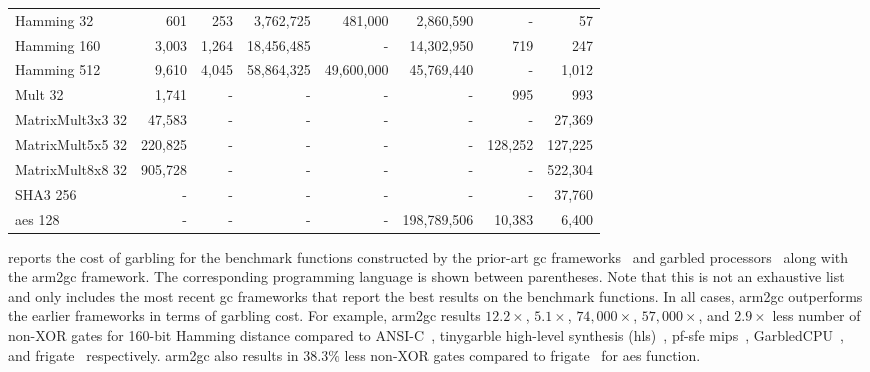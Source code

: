 \begin{table*}[t]
{\begin{tabular}{l||r|r|r|r|r|r||r}
Hamming 32 & 601 & 253 & 3,762,725 & 481,000 & 2,860,590 & - & 57 \\
Hamming 160 & 3,003 & 1,264 & 18,456,485 & - & 14,302,950 & 719 & 247 \\
Hamming 512 & 9,610 & 4,045 & 58,864,325 & 49,600,000 & 45,769,440 & - & 1,012 \\
Mult 32 & 1,741 & - & - & - & - & 995 & 993 \\
MatrixMult3x3 32 & 47,583 & - & - & - & - & - & 27,369 \\
MatrixMult5x5 32 & 220,825 & - & - & - & - & 128,252 & 127,225 \\
MatrixMult8x8 32 & 905,728 & - & - & - & - & - & 522,304 \\
SHA3 256 & - & - & - & - & - & - & 37,760 \\
\acrshort{aes} 128 & - & - & - & - & 198,789,506 & 10,383 & 6,400
\end{tabular}
}
\end{table*}

 reports the cost of garbling for the benchmark functions constructed by the prior-art \acrshort{gc} frameworks~\cite{holzer2012secure, songhori2015tinygarble, mood2016frigate} and garbled processors~\cite{wang2016secure, songhori2016garbledcpu} along with the \gls{arm2gc} framework.
The corresponding programming language is shown between parentheses.
Note that this is not an exhaustive list and only includes the most recent \acrshort{gc} frameworks that report the best results on the benchmark functions.
In all cases, \gls{arm2gc} outperforms the earlier frameworks in terms of garbling cost.
For example, \gls{arm2gc} results $12.2\times$,  $5.1\times$, $74,000\times$, $57,000\times$, and $2.9\times$ less number of non-XOR gates for 160-bit Hamming distance compared to ANSI-C~\cite{holzer2012secure}, \gls{tinygarble} high-level synthesis (\acrshort{hls})~\cite{songhori2015tinygarble}, \acrshort{pf-sfe} \gls{mips}~\cite{songhori2015tinygarble}, GarbledCPU~\cite{songhori2016garbledcpu}, and \gls{frigate}~\cite{mood2016frigate} respectively.
\gls{arm2gc} also results in $38.3\%$ less non-XOR gates compared to \gls{frigate}~\cite{mood2016frigate} for \acrshort{aes} function.

